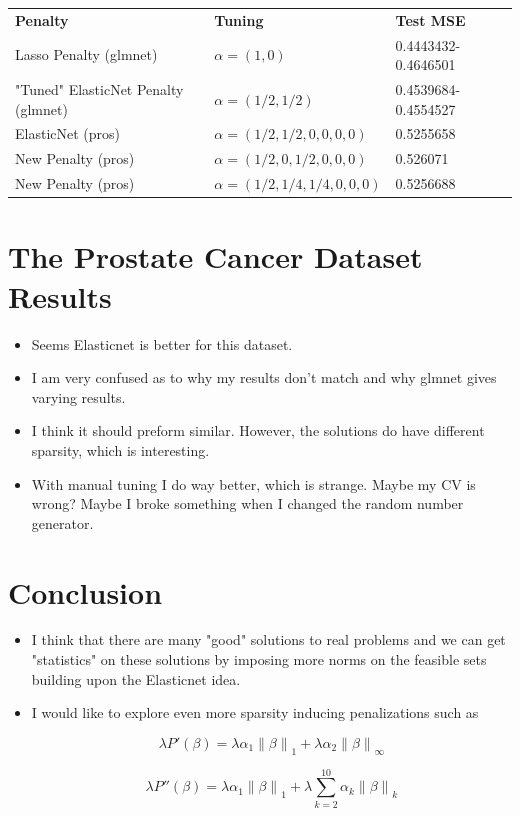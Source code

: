 \documentclass[10pt, reqno]{article}
\numberwithin{equation}{section}
\newcommand{\norm}[1]{\left\lVert#1\right\rVert}
\begin{document}
\begin{center}
\begingroup
\setlength{\tabcolsep}{1pt} %
\renewcommand{\arraystretch}{2} %
\begin{tabular}{ l l l}
\textbf{Penalty} & \textbf{Tuning} & \textbf{Test MSE} \\
Lasso Penalty (glmnet) & $\alpha = (1, 0)$ & 0.4443432-0.4646501 \\
"Tuned" ElasticNet Penalty (glmnet) & $\alpha = (1/2, 1/2)$  & 0.4539684-0.4554527   \\
ElasticNet (pros) & $\alpha = (1/2, 1/2, 0, 0, 0, 0)$ & 0.5255658 \\
New Penalty (pros) & $\alpha = (1/2, 0, 1/2, 0, 0, 0)$ & 0.526071 \\
New Penalty (pros) & $\alpha = (1/2, 1/4, 1/4, 0, 0, 0)$ & 0.5256688 \\
\end{tabular}
\endgroup
\end{center}

\newpage
\section*{The Prostate Cancer Dataset Results}

\begin{itemize}
\item Seems Elasticnet \cite{elasticnet} is better for this dataset.

\item I am very confused as to why my results don't match and why glmnet gives varying results.

\item I think it should preform similar. However, the solutions do have different sparsity, which is interesting.

\item With manual tuning I do way better, which is strange. Maybe my CV is wrong? Maybe I broke something when I changed the random number generator.

\end{itemize}

\newpage
\section*{Conclusion}

\begin{itemize}
\item I think that there are many "good" solutions to real problems and we can get "statistics" on these solutions by imposing more norms on the feasible sets building upon the Elasticnet \cite{elasticnet} idea.

\item I would like to explore even more sparsity inducing penalizations such as

\[
\lambda P'(\beta) = \lambda \alpha_1 \norm{\beta}_1 + \lambda \alpha_2 \norm{\beta}_\infty 
\]

\[
\lambda P''(\beta) = \lambda \alpha_1 \norm{\beta}_1 + \lambda \sum_{k = 2}^{10} \alpha_k \norm{\beta}_{k}
\]

\end{itemize}
\end{document}
